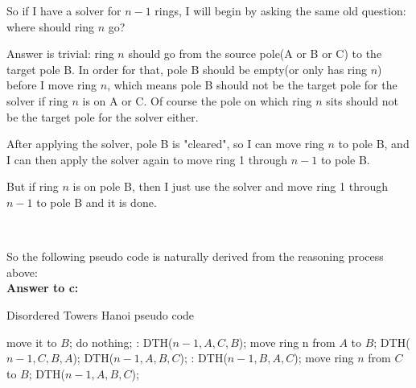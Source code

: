 \documentclass[a4paper,11pt]{article}
\theoremstyle{mytheor}
\begin{document}
So if I have a solver for $n-1$ rings, I will begin by asking the same old question: where should ring $n$ go?

Answer is trivial: ring $n$ should go from the source pole(A or B or C) to the target pole B. In order for that, pole B should be empty(or only has ring $n$) before I move ring $n$, which means pole B should not be the target pole for the solver if ring $n$ is on A or C. Of course the pole on which ring $n$ sits should not be the target pole for the solver either.

After applying the solver, pole B is "cleared", so I can move ring $n$ to pole B, and I can then apply the solver again to move ring 1 through $n-1$ to pole B.

But if ring $n$ is on pole B, then I just use the solver and move ring 1 through $n-1$ to pole B and it is done.

~\\
\vspace{1.2in}


So the following pseudo code is naturally derived from the reasoning process above:
~\\
\noindent\textbf{Answer to c:}
\begin{algorithm}[H]
\caption{Disordered Towers Hanoi pseudo code}
\begin{algorithmic}[1]
       \State move it to $B$;
    \Else
       \State do nothing;
    \EndIf
  \Else:
      \State DTH({$n-1, A, C, B$});
      \State move ring n from $A$ to $B$;
      \State DTH($n-1, C, B, A$);
      \State DTH($n-1, A, B,C$);
    \Else:
      \State DTH($n-1, B, A, C$);
      \State move ring $n$ from $C$ to $B$;
      \State DTH($n-1, A, B, C$);
    \EndIf
  \EndIf
\EndProcedure
\end{algorithmic}
\end{algorithm}




\iffalse
\begin{lstlisting}[label={list:second},caption=Disordered Towers Hanoi pseudo code.]
procedure DTH(n, A, B, C);
  if n == 1:
    if ring is on A or on C, move it to B;
    else: do nothing;
  else:
    if ring n on A:
      DTH(n-1, A, C, B);
      move ring n from A to B;
      DTH(n-1, C, B, A);
    elseif ring n on B:
      DTH(n-1, A, B,C);
    else:
      DTH(n-1, B, A, C);
      move ring n from C to B;
      DTH(n-1, A, B, C);
  end if
\end{lstlisting}
\fi
\end{document}
